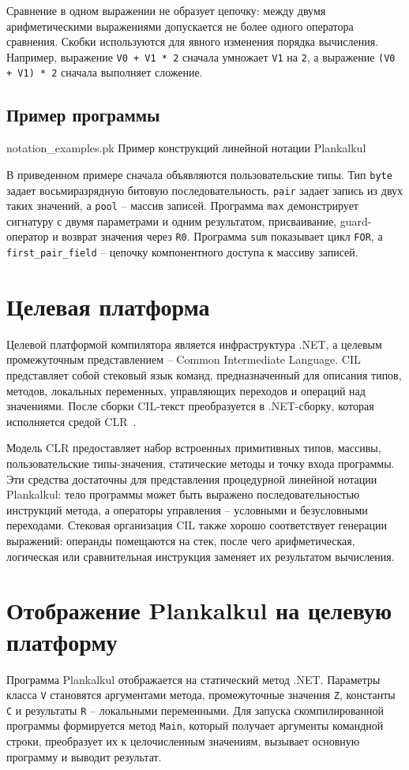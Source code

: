 Сравнение в одном выражении не образует цепочку: между двумя арифметическими выражениями допускается не более одного оператора сравнения.
Скобки используются для явного изменения порядка вычисления.
Например, выражение \texttt{V0 + V1 * 2} сначала умножает \texttt{V1} на \texttt{2}, а выражение \texttt{(V0 + V1) * 2} сначала выполняет сложение.

\subsection{Пример программы}
{notation_examples.pk}
{Пример конструкций линейной нотации Plankalkul}

В приведенном примере сначала объявляются пользовательские типы.
Тип \texttt{byte} задает восьмиразрядную битовую последовательность, \texttt{pair} задает запись из двух таких значений, а \texttt{pool} -- массив записей.
Программа \texttt{max} демонстрирует сигнатуру с двумя параметрами и одним результатом, присваивание, guard-оператор и возврат значения через \texttt{R0}.
Программа \texttt{sum} показывает цикл \texttt{FOR}, а \texttt{first\_pair\_field} -- цепочку компонентного доступа к массиву записей.

\section{Целевая платформа}
Целевой платформой компилятора является инфраструктура .NET, а целевым промежуточным представлением -- Common Intermediate Language.
CIL представляет собой стековый язык команд, предназначенный для описания типов, методов, локальных переменных, управляющих переходов и операций над значениями.
После сборки CIL-текст преобразуется в .NET-сборку, которая исполняется средой CLR~\cite{ecma335,dotnet}.

Модель CLR предоставляет набор встроенных примитивных типов, массивы, пользовательские типы-значения, статические методы и точку входа программы.
Эти средства достаточны для представления процедурной линейной нотации Plankalkul: тело программы может быть выражено последовательностью инструкций метода, а операторы управления -- условными и безусловными переходами.
Стековая организация CIL также хорошо соответствует генерации выражений: операнды помещаются на стек, после чего арифметическая, логическая или сравнительная инструкция заменяет их результатом вычисления.

\section{Отображение Plankalkul на целевую платформу}
Программа Plankalkul отображается на статический метод .NET.
Параметры класса \texttt{V} становятся аргументами метода, промежуточные значения \texttt{Z}, константы \texttt{C} и результаты \texttt{R} -- локальными переменными.
Для запуска скомпилированной программы формируется метод \texttt{Main}, который получает аргументы командной строки, преобразует их к целочисленным значениям, вызывает основную программу и выводит результат.

